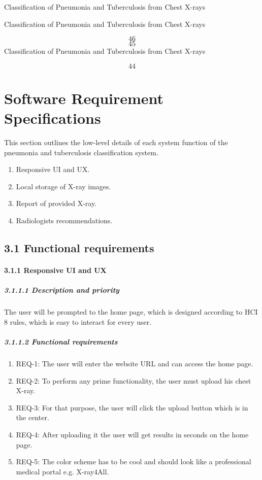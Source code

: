 \documentclass{article} %
\begin{document}
Classification of Pneumonia and Tuberculosis from Chest X-rays

\noindent 

\noindent Classification of Pneumonia and Tuberculosis from Chest X-rays

\noindent 
\[46\] 
\[45\] 
Classification of Pneumonia and Tuberculosis from Chest X-rays

\noindent 
\[44\] 
\textbf{}


\section{ Software Requirement Specifications}

\noindent This section outlines the low-level details of each system function of the pneumonia and tuberculosis classification system.

\begin{enumerate}
\item  Responsive UI and UX.

\item  Local storage of X-ray images.

\item  Report of provided X-ray.

\item  Radiologists recommendations.
\end{enumerate}

\noindent 
\subsection{3.1 Functional requirements}

\noindent 
\paragraph{3.1.1  Responsive UI and UX}

\noindent 
\subparagraph{3.1.1.1 Description and priority}

\noindent The user will be prompted to the home page, which is designed according to HCI 8 rules, which is easy to interact for every user.

\noindent 
\subparagraph{3.1.1.2 Functional requirements}

\begin{enumerate}
\item  REQ-1: The user will enter the website URL and can access the home page.

\item  REQ-2: To perform any prime functionality, the user must upload his chest X-ray.

\item  REQ-3: For that purpose, the user will click the upload button which is in the center.

\item  REQ-4: After uploading it the user will get results in seconds on the home page.

\item  REQ-5: The color scheme has to be cool and should look like a professional medical portal e.g. X-ray4All.
\end{enumerate}
\end{document}
